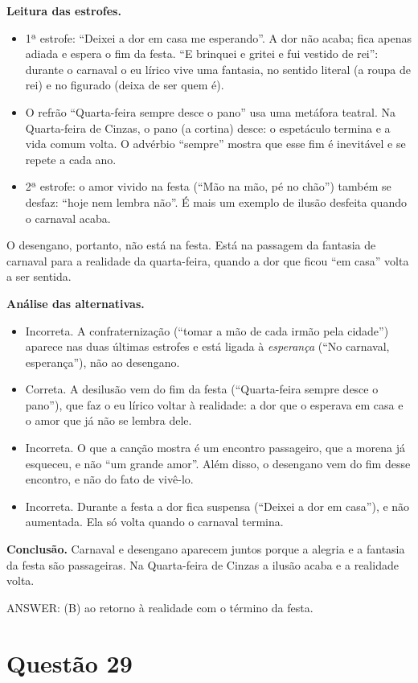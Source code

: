 \documentclass{article}%
\begin{document}
\textbf{Leitura das estrofes.}
\begin{itemize}
  \item 1ª estrofe: ``Deixei a dor em casa me esperando''. A dor não acaba; fica apenas adiada e espera o fim da festa. ``E brinquei e gritei e fui vestido de rei'': durante o carnaval o eu lírico vive uma fantasia, no sentido literal (a roupa de rei) e no figurado (deixa de ser quem é).
  \item O refrão ``Quarta-feira sempre desce o pano'' usa uma metáfora teatral. Na Quarta-feira de Cinzas, o pano (a cortina) desce: o espetáculo termina e a vida comum volta. O advérbio ``sempre'' mostra que esse fim é inevitável e se repete a cada ano.
  \item 2ª estrofe: o amor vivido na festa (``Mão na mão, pé no chão'') também se desfaz: ``hoje nem lembra não''. É mais um exemplo de ilusão desfeita quando o carnaval acaba.
\end{itemize}
O desengano, portanto, não está na festa. Está na passagem da fantasia de carnaval para a realidade da quarta-feira, quando a dor que ficou ``em casa'' volta a ser sentida.

\textbf{Análise das alternativas.}
\begin{itemize}
  \item[a)] Incorreta. A confraternização (``tomar a mão de cada irmão pela cidade'') aparece nas duas últimas estrofes e está ligada à \emph{esperança} (``No carnaval, esperança''), não ao desengano.
  \item[b)] Correta. A desilusão vem do fim da festa (``Quarta-feira sempre desce o pano''), que faz o eu lírico voltar à realidade: a dor que o esperava em casa e o amor que já não se lembra dele.
  \item[c)] Incorreta. O que a canção mostra é um encontro passageiro, que a morena já esqueceu, e não ``um grande amor''. Além disso, o desengano vem do fim desse encontro, e não do fato de vivê-lo.
  \item[d)] Incorreta. Durante a festa a dor fica suspensa (``Deixei a dor em casa''), e não aumentada. Ela só volta quando o carnaval termina.
\end{itemize}

\textbf{Conclusão.} Carnaval e desengano aparecem juntos porque a alegria e a fantasia da festa são passageiras. Na Quarta-feira de Cinzas a ilusão acaba e a realidade volta.

ANSWER: (B) ao retorno à realidade com o término da festa.%
\newpage%
\section*{Questão 29}
\end{document}
